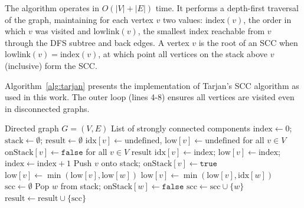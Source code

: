 The algorithm operates in $O(|V| + |E|)$ time. It performs a depth-first traversal of the graph, maintaining for each vertex $v$ two values: $\text{index}(v)$, the order in which $v$ was visited and $\text{lowlink}(v)$, the smallest index reachable from $v$ through the DFS subtree and back edges. A vertex $v$ is the root of an SCC when $\text{lowlink}(v) = \text{index}(v)$, at which point all vertices on the stack above $v$ (inclusive) form the SCC.

Algorithm~\ref{alg:tarjan} presents the implementation of Tarjan's SCC algorithm as used in this work. The outer loop (lines 4-8) ensures all vertices are visited even in disconnected graphs.

\begin{algorithm}[htbp]
\caption{Tarjan's SCC Algorithm for Cycle Detection}\label{alg:tarjan}
\begin{algorithmic}[1]
    \Require Directed graph $G = (V, E)$
    \Ensure List of strongly connected components
    \State $\text{index} \gets 0$; $\text{stack} \gets \emptyset$; $\text{result} \gets \emptyset$
    \State $\text{idx}[v] \gets \text{undefined}$, $\text{low}[v] \gets \text{undefined}$ for all $v \in V$
    \State $\text{onStack}[v] \gets \texttt{false}$ for all $v \in V$
            \State {}
        \EndIf
    \EndFor
    \State \Return $\text{result}$
    \Statex
        \State $\text{idx}[v] \gets \text{index}$; $\text{low}[v] \gets \text{index}$; $\text{index} \gets \text{index} + 1$
        \State Push $v$ onto stack; $\text{onStack}[v] \gets \texttt{true}$
                \State {}
                \State $\text{low}[v] \gets \min(\text{low}[v], \text{low}[w])$
            \State $\text{low}[v] \gets \min(\text{low}[v], \text{idx}[w])$
            \EndIf
        \EndFor
            \State $\text{scc} \gets \emptyset$
            \Repeat
                \State Pop $w$ from stack; $\text{onStack}[w] \gets \texttt{false}$
                \State $\text{scc} \gets \text{scc} \cup \{w\}$
            \State $\text{result} \gets \text{result} \cup \{\text{scc}\}$
        \EndIf
    \EndProcedure
\end{algorithmic}
\end{algorithm}

